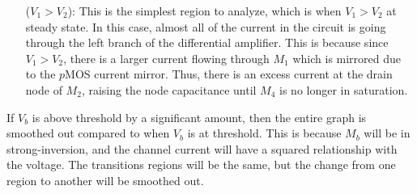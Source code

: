\documentclass{article}
\begin{document}
\begin{itemize}
    \item [($V_1 > V_2$):] 
        This is the simplest region to analyze, which is when $V_1 > V_2$ at steady state. In this case, almost all of the current in the circuit is going through the left branch of the differential amplifier. This is because since $V_1 > V_2$, there is a larger current flowing through $M_1$ which is mirrored due to the $p$MOS current mirror. Thus, there is an excess current at the drain node of $M_2$, raising the node capacitance until $M_4$ is no longer in saturation.

\end{itemize}

If $V_b$ is above threshold by a significant amount, then the entire graph is smoothed out compared to when $V_b$ is at threshold. This is because $M_b$ will be in strong-inversion, and the channel current will have a squared relationship with the voltage. The transitions regions will be the same, but the change from one region to another will be smoothed out.
\end{document}
